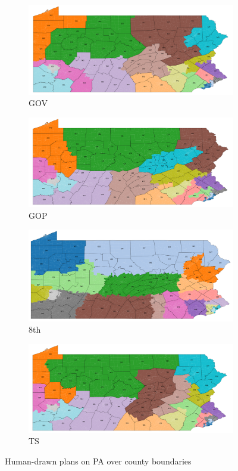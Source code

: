 \documentclass{mgggarticle}
\begin{document}
\begin{figure}[h]
\begin{subfigure}{0.475\textwidth}
\includegraphics[width=\textwidth]{figs/GOV_counties.png}
\caption{GOV}
\end{subfigure}
\begin{subfigure}{0.475\textwidth}
\includegraphics[width=\textwidth]{figs/GOP_counties.png}
\caption{GOP}
\end{subfigure}

\begin{subfigure}{0.475\textwidth}
\includegraphics[width=\textwidth]{figs/8th_counties.png}
\caption{8th}
\end{subfigure}
\begin{subfigure}{0.475\textwidth}
\includegraphics[width=\textwidth]{figs/TS_counties.png}
\caption{TS}
\end{subfigure}

\caption{Human-drawn plans on PA over county boundaries}
\end{figure}
\end{document}
